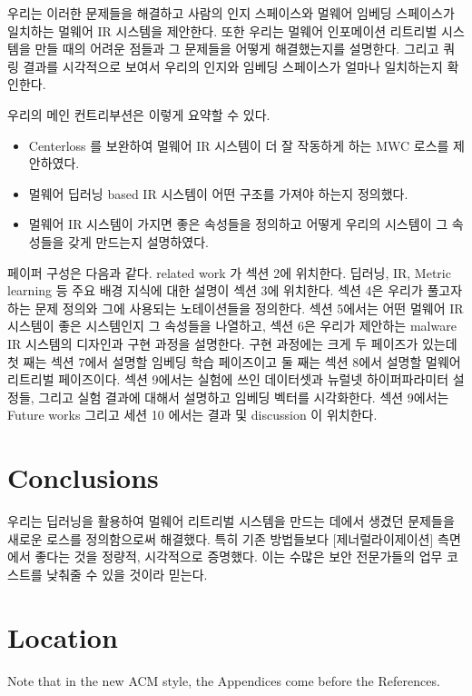 우리는 이러한 문제들을 해결하고 사람의 인지 스페이스와 멀웨어 임베딩 스페이스가 일치하는 멀웨어 IR 시스템을 제안한다. 또한 우리는 멀웨어 인포메이션 리트리벌 시스템을 만들 때의 어려운 점들과 그 문제들을 어떻게 해결했는지를 설명한다. 그리고 쿼링 결과를 시각적으로 보여서 우리의 인지와 임베딩 스페이스가 얼마나 일치하는지 확인한다. %

우리의 메인 컨트리부션은 이렇게 요약할 수 있다.

\begin{itemize}
\item Centerloss 를 보완하여 멀웨어 IR 시스템이 더 잘 작동하게 하는 MWC 로스를 제안하였다.
\item 멀웨어 딥러닝 based IR 시스템이 어떤 구조를 가져야 하는지 정의했다.
\item 멀웨어 IR 시스템이 가지면 좋은 속성들을 정의하고 어떻게 우리의 시스템이 그 속성들을 갖게 만드는지 설명하였다.
\end{itemize}

페이퍼 구성은 다음과 같다. related work 가 섹션 2에 위치한다. 딥러닝, IR, Metric learning 등 주요 배경 지식에 대한 설명이 섹션 3에 위치한다. 섹션 4은 우리가 풀고자하는 문제 정의와 그에 사용되는 노테이션들을 정의한다. 섹션 5에서는 어떤 멀웨어 IR 시스템이 좋은 시스템인지 그 속성들을 나열하고, 섹션 6은 우리가 제안하는 malware IR 시스템의 디자인과 구현 과정을 설명한다. 구현 과정에는 크게 두 페이즈가 있는데 첫 째는 섹션 7에서 설명할 임베딩 학습 페이즈이고 둘 째는 섹션 8에서 설명할 멀웨어 리트리벌 페이즈이다. 섹션 9에서는 실험에 쓰인 데이터셋과 뉴럴넷 하이퍼파라미터 설정들, 그리고 실험 결과에 대해서 설명하고 임베딩 벡터를 시각화한다. 섹션 9에서는 Future works 그리고 세션 10 에서는 결과 및 discussion 이 위치한다. 








\section{Conclusions}

우리는 딥러닝을 활용하여 멀웨어 리트리벌 시스템을 만드는 데에서 생겼던 문제들을 새로운 로스를 정의함으로써 해결했다. 특히 기존 방법들보다 [제너럴라이제이션] 측면에서 좋다는 것을 정량적, 시각적으로 증명했다. 이는 수많은 보안 전문가들의 업무 코스트를 낮춰줄 수 있을 것이라 믿는다.

\appendix

\section{Location}

Note that in the new ACM style, the Appendices come before the References.


\begin{acks}
\end{acks}
